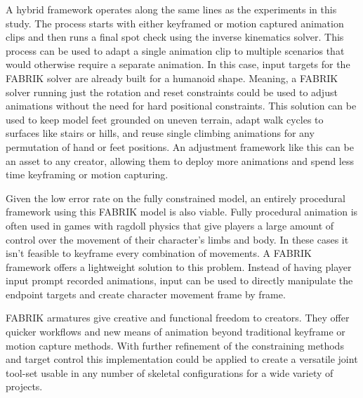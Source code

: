 \documentclass[10pt,twocolumn]{article}
\begin{document}
A hybrid framework operates along the same lines as the experiments in this study. The process starts with either keyframed or motion captured animation clips and then runs a final spot check using the inverse kinematics solver. This process can be used to adapt a single animation clip to multiple scenarios that would otherwise require a separate animation. In this case, input targets for the FABRIK solver are already built for a humanoid shape. Meaning, a FABRIK solver running just the rotation and reset constraints could be used to adjust animations without the need for hard positional constraints. This solution can be used to keep model feet grounded on uneven terrain, adapt walk cycles to surfaces like stairs or hills, and reuse single climbing animations for any permutation of hand or feet positions. An adjustment framework like this can be an asset to any creator, allowing them to deploy more animations and spend less time keyframing or motion capturing.

Given the low error rate on the fully constrained model, an entirely procedural framework using this FABRIK model is also viable. Fully procedural animation is often used in games with ragdoll physics that give players a large amount of control over the movement of their character's limbs and body. In these cases it isn’t feasible to keyframe every combination of movements. A FABRIK framework offers a lightweight solution to this problem. Instead of having player input prompt recorded animations, input can be used to directly manipulate the endpoint targets and create character movement frame by frame. 

FABRIK armatures give creative and functional freedom to creators. They offer quicker workflows and new means of animation beyond traditional keyframe or motion capture methods. With further refinement of the constraining methods and target control this implementation could be applied to create a versatile joint tool-set usable in any number of skeletal configurations for a wide variety of projects.

\printbibliography
\end{document}
